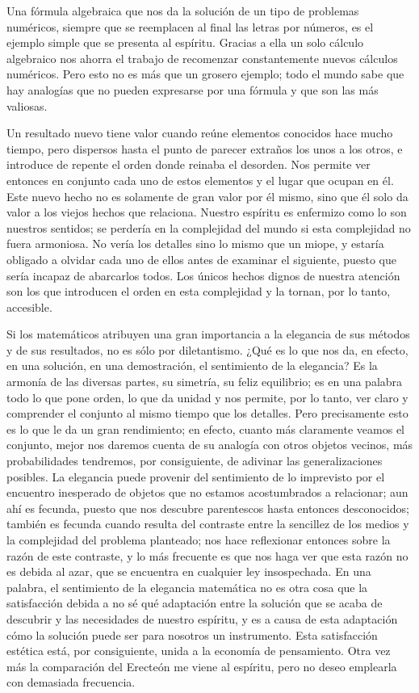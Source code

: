 \documentclass[a4paper, 12pt]{article}
\begin{document}
Una fórmula algebraica que nos da la solución de un tipo de
problemas numéricos, siempre que se reemplacen al final las letras por números, es el ejemplo simple que se presenta al espíritu. Gracias a
ella un solo cálculo algebraico nos ahorra el trabajo de recomenzar
constantemente nuevos cálculos numéricos. Pero esto no es más
que un grosero ejemplo; todo 
el mundo sabe que hay analogías que no pueden expresarse por una fórmula y que son las más valiosas.



Un resultado nuevo tiene valor cuando reúne elementos conocidos hace
mucho tiempo, pero dispersos hasta el punto de parecer extraños los unos
a los otros, e introduce de repente el orden donde reinaba el desorden. Nos
permite ver entonces en conjunto cada uno de estos elementos y el lugar que
ocupan en él. Este nuevo hecho no es solamente de gran valor por él
mismo, sino que él solo da valor a los viejos hechos que relaciona. Nuestro espíritu es enfermizo como lo son nuestros sentidos; se perdería en la complejidad del mundo si esta complejidad no fuera armoniosa.
No vería los detalles sino lo mismo que un miope, y estaría
obligado a olvidar cada uno de ellos antes de examinar el siguiente, puesto
que sería incapaz de abarcarlos todos. Los únicos hechos dignos de
nuestra atención son los que introducen el orden en esta complejidad y
la tornan, por lo tanto, accesible.

Si los matemáticos atribuyen una gran importancia a la elegancia de sus métodos y de sus resultados, no es sólo por diletantismo. ¿Qué
es lo que nos da, en efecto, en una solución, en una demostración,
el sentimiento de la elegancia? Es la armonía de las diversas partes,
su simetría, su feliz equilibrio; es en una palabra todo lo que pone
orden, lo que da unidad y nos permite, por lo tanto, ver claro y comprender
el conjunto al mismo tiempo que los detalles. Pero precisamente esto es lo
que le da un gran rendimiento; en efecto, cuanto más claramente veamos
el conjunto, mejor nos daremos cuenta de su analogía con otros objetos
vecinos, más probabilidades tendremos, por consiguiente, de adivinar las
generalizaciones posibles. La elegancia puede provenir del sentimiento de lo
imprevisto por el encuentro inesperado de objetos que no estamos
acostumbrados a relacionar; aun ahí es fecunda, puesto que nos
descubre parentescos hasta entonces desconocidos; también es fecunda
cuando resulta del contraste entre la sencillez de los medios y la
complejidad del problema planteado; nos hace reflexionar entonces sobre la
razón de este contraste, y lo más frecuente es que nos haga ver que
esta razón no es debida al azar, que se encuentra en cualquier
 ley insospechada. En una palabra, el sentimiento de la elegancia matemática no es otra cosa que la satisfacción debida a no sé qué
adaptación entre la solución que se acaba de descubrir y las
necesidades de nuestro espíritu, y es a causa de esta adaptación cómo la solución puede ser para nosotros un instrumento. Esta
satisfacción estética está, por consiguiente, unida a la economía de pensamiento. Otra vez más la comparación del Erecteón
me viene al espíritu, pero no deseo emplearla con demasiada frecuencia.
\end{document}
